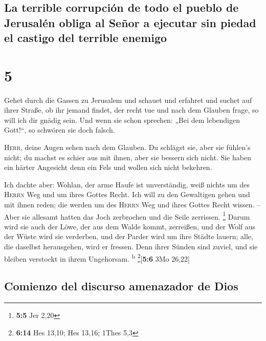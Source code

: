 \hypertarget{la-terrible-corrupciuxf3n-de-todo-el-pueblo-de-jerusaluxe9n-obliga-al-seuxf1or-a-ejecutar-sin-piedad-el-castigo-del-terrible-enemigo}{%
\subsection{La terrible corrupción de todo el pueblo de Jerusalén obliga
al Señor a ejecutar sin piedad el castigo del terrible
enemigo}\label{la-terrible-corrupciuxf3n-de-todo-el-pueblo-de-jerusaluxe9n-obliga-al-seuxf1or-a-ejecutar-sin-piedad-el-castigo-del-terrible-enemigo}}

\hypertarget{section-4}{%
\section{5}\label{section-4}}

 Gehet durch die Gassen zu Jerusalem und schauet und
erfahret und suchet auf ihrer Straße, ob ihr jemand findet, der recht
tue und nach dem Glauben frage, so will ich dir gnädig sein.
 Und wenn sie schon sprechen: „Bei dem lebendigen
Gott!{}``, so schwören sie doch falsch.

 \textsc{Herr}, deine Augen sehen nach dem Glauben. Du
schlägst sie, aber sie fühlen's nicht; du machst es schier aus mit
ihnen, aber sie bessern sich nicht. Sie haben ein härter Angesicht denn
ein Fels und wollen sich nicht bekehren.

 Ich dachte aber: Wohlan, der arme Haufe ist unverständig,
weiß nichts um des \textsc{Herrn} Weg und um ihres Gottes Recht.
 Ich will zu den Gewaltigen gehen und mit ihnen reden; die
werden um des \textsc{Herrn} Weg und ihres Gottes Recht wissen. -- Aber
sie allesamt hatten das Joch zerbrochen und die Seile zerrissen.
\footnote{\textbf{5:5} Jer 2,20}  Darum wird sie auch der
Löwe, der aus dem Walde kommt, zerreißen, und der Wolf aus der Wüste
wird sie verderben, und der Parder wird um ihre Städte lauern; alle, die
daselbst herausgehen, wird er fressen. Denn ihrer Sünden sind zuviel,
und sie bleiben verstockt in ihrem Ungehorsam. \textsuperscript{b}
\footnote{\textbf{6:14} Hes 13,10; Hes 13,16; 1Thes 5,3}{[}\textbf{5:6}
3Mo 26,22{]}

\hypertarget{comienzo-del-discurso-amenazador-de-dios}{%
\subsection{Comienzo del discurso amenazador de
Dios}\label{comienzo-del-discurso-amenazador-de-dios}}

